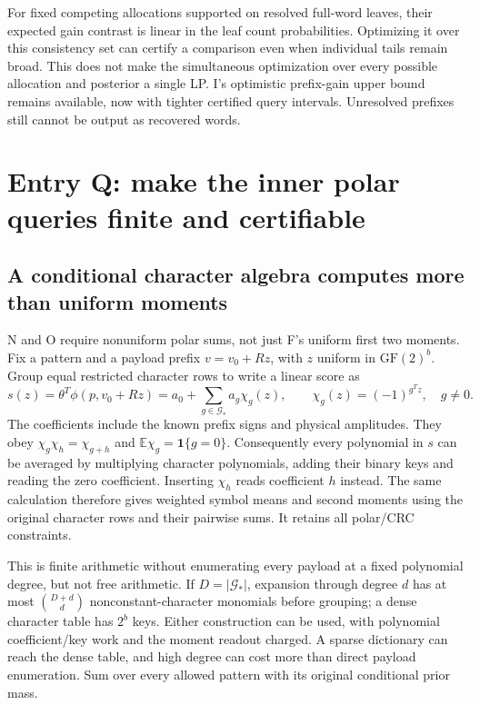 \documentclass[10pt,a4paper]{article}
\newcommand{\E}{\mathbb E}
\newcommand{\ind}{\mathbf 1}
\begin{document}
For fixed competing allocations supported on resolved full-word leaves, their expected gain contrast is
linear in the leaf count probabilities. Optimizing it over this consistency set can certify a comparison
even when individual tails remain broad. This does not make the simultaneous optimization over every
possible allocation and posterior a single LP. I's optimistic prefix-gain upper bound remains available,
now with tighter certified query intervals. Unresolved prefixes still cannot be output as recovered words.

\clearpage
\section{Entry Q: make the inner polar queries finite and certifiable}
\label{sec:polar-inner-closure}
\subsection{A conditional character algebra computes more than uniform moments}
N and O require nonuniform polar sums, not just F's uniform first two moments.
Fix a pattern and a payload prefix $v=v_0+Rz$, with $z$ uniform in $\mathrm{GF}(2)^b$.
Group equal restricted character rows to write a linear score as
\[
 s(z)=\theta^T\phi(p,v_0+Rz)
     =a_0+\sum_{g\in\mathcal G_*}a_g\chi_g(z),\qquad
 \chi_g(z)=(-1)^{g^Tz},\quad g\ne0.
\]
The coefficients include the known prefix signs and physical amplitudes. They obey
$\chi_g\chi_h=\chi_{g+h}$ and $\E\chi_g=\ind\{g=0\}$.
Consequently every polynomial in $s$ can be averaged by multiplying character polynomials, adding their
binary keys and reading the zero coefficient. Inserting $\chi_h$ reads coefficient $h$ instead.
The same calculation therefore gives weighted symbol means and second moments using the original
character rows and their pairwise sums. It retains all polar/CRC constraints.

This is finite arithmetic without enumerating every payload at a fixed polynomial degree, but not free
arithmetic. If $D=|\mathcal G_*|$, expansion through degree $d$ has at most
$\binom{D+d}{d}$ nonconstant-character monomials before grouping; a dense character table has $2^b$
keys. Either construction can be used, with polynomial coefficient/key work and the moment readout
charged. A sparse dictionary can reach the dense table, and high degree can cost more than direct payload
enumeration. Sum over every allowed pattern with its original conditional prior mass.
\end{document}
